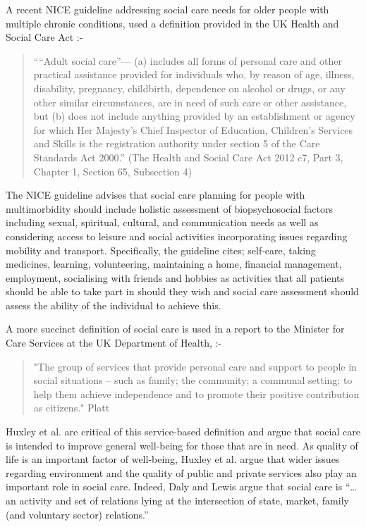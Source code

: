 \documentclass[12pt,]{report}
\begin{document}
\citep[pp38]{RN406}

A recent NICE guideline \citeyearpar{RN150} addressing social care needs
for older people with multiple chronic conditions, used a definition
provided in the UK Health and Social Care Act \citeyearpar{RN149}:-

\begin{quotation}
    ““Adult social care”—
    (a) includes all forms of personal care and other practical assistance provided for individuals who, by reason of age, illness, disability, pregnancy, childbirth, dependence on alcohol or drugs, or any other similar circumstances, are in need of such care or other assistance, but 
    (b) does not include anything provided by an establishment or agency for which Her Majesty’s Chief Inspector of Education, Children’s Services and Skills is the registration authority under section 5 of the Care Standards Act 2000.”
    (The Health and Social Care Act  2012 c7, Part 3, Chapter 1, Section 65, Subsection 4)
\end{quotation}

The NICE guideline \citeyearpar{RN150} advises that social care planning
for people with multimorbidity should include holistic assessment of
biopsychosocial factors including sexual, spiritual, cultural, and
communication needs as well as considering access to leisure and social
activities incorporating issues regarding mobility and transport.
Specifically, the guideline cites; self-care, taking medicines,
learning, volunteering, maintaining a home, financial management,
employment, socialising with friends and hobbies as activities that all
patients should be able to take part in should they wish and social care
assessment should assess the ability of the individual to achieve this.

A more succinct definition of social care is used in a report to the
Minister for Care Services at the UK Department of Health, :-

\begin{quotation}
    "The group of services that provide personal care and support to people in social situations – such as family; the community; a communal setting; to help them achieve independence and to promote their positive contribution as citizens." Platt 
\end{quotation}

\citeyearpar[pp.~4]{RN154}

Huxley et al. \citeyearpar{RN153} are critical of this service-based
definition and argue that social care is intended to improve general
well-being for those that are in need. As quality of life is an
important factor of well-being, Huxley et al. \citeyearpar{RN153} argue
that wider issues regarding environment and the quality of public and
private services also play an important role in social care. Indeed,
Daly and Lewis \citeyearpar[pp.287]{RN146} argue that social care is
``\ldots{}an activity and set of relations lying at the intersection of
state, market, family (and voluntary sector) relations.''
\end{document}
